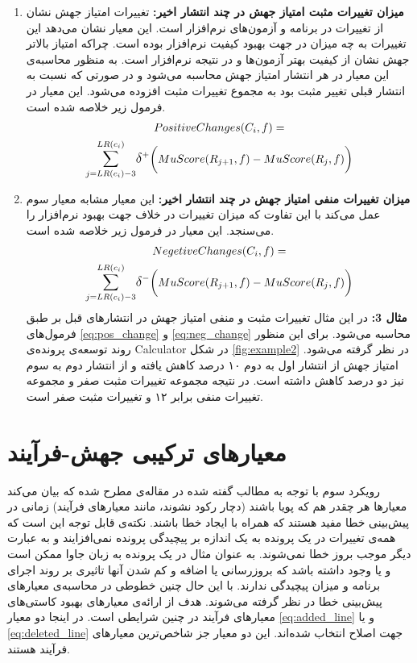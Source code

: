 \begin{enumerate}
	\item 
	\textbf{
		میزان تغییرات مثبت امتیاز جهش  در چند انتشار اخیر:}
	تغییرات امتیاز جهش نشان از تغییرات در برنامه و آزمون‌های نرم‌افزار است. این معیار نشان می‌دهد این تغییرات به چه میزان در جهت بهبود کیفیت نرم‌افزار بوده است. چراکه امتیاز بالاتر جهش نشان از کیفیت بهتر آزمون‌ها و در نتیجه نرم‌افزار است.  به منظور محاسبه‌ی این معیار در هر انتشار امتیاز جهش محاسبه می‌شود و در صورتی که نسبت به انتشار قبلی تغییر مثبت  بود به مجموع تغییرات  مثبت  افزوده می‌شود. این معیار در فرمول زیر خلاصه شده است.
\begin{multline} \label{eq:pos_change}
PositiveChanges(C_i,f) = \\ \mathlarger{\sum}\limits_{j=LR(c_i)-3}^{LR(c_i)} 
\mathlarger{\delta}^+\bigg(MuScore(R_{j+1},f) - MuScore(R_j,f)\bigg) 
\end{multline}	


	\item 
	\textbf{
		میزان تغییرات منفی امتیاز جهش در چند انتشار اخیر:}
	این معیار مشابه معیار سوم عمل می‌کند با این تفاوت که میزان تغییرات در خلاف جهت بهبود نرم‌افزار را می‌سنجد. این معیار در فرمول زیر خلاصه شده است.
\begin{multline} \label{eq:neg_change}
NegetiveChanges(C_i,f) = \\ \mathlarger{\sum}\limits_{j=LR(c_i)-3}^{LR(c_i)} 
\mathlarger{\delta}^-\bigg(MuScore(R_{j+1},f) - MuScore(R_j,f)\bigg) 
\end{multline}	
\textbf{مثال 3:}
در این مثال تغییرات مثبت و منفی امتیاز جهش در انتشارهای قبل   بر طبق فرمول‌های  \ref{eq:pos_change} و \ref{eq:neg_change} محاسبه می‌شود. برای این منظور روند توسعه‌ی پرونده‌ی Calculator در شکل \ref{fig:example2}  در نظر گرفته می‌شود. امتیاز جهش از انتشار اول به دوم ۱۰ درصد کاهش یافته و از انتشار دوم به سوم نیز دو درصد کاهش داشته است. در نتیجه مجموعه تغییرات مثبت صفر و مجموعه تغییرات منفی برابر ۱۲ و تغییرات مثبت صفر است. 
	
\end{enumerate}


\section{معیارهای ترکیبی جهش-فرآیند}

رویکرد سوم با توجه به مطالب گفته شده در مقاله‌ی \cite{rahman2013and} مطرح شده که بیان می‌کند معیارها هر چقدر هم که پویا باشند (دچار رکود نشوند، مانند معیارهای فرآیند) زمانی در پیش‌بینی خطا مفید هستند که همراه با ایجاد خطا باشند. نکته‌ی قابل توجه این است که همه‌ی تغییرات در یک پرونده به یک اندازه  بر پیچیدگی پرونده نمی‌افزایند و به عبارت دیگر موجب بروز خطا نمی‌شوند. به عنوان مثال در یک پرونده به زبان جاوا ممکن است  و یا  وجود داشته باشد که بروزرسانی یا اضافه و کم شدن آنها تاثیری بر روند اجرای برنامه و میزان پیچیدگی ندارند. با این حال  چنین خطوطی در محاسبه‌ی معیارهای پیش‌بینی خطا در نظر گرفته می‌شوند. هدف از ارائه‌ی معیارهای  بهبود کاستی‌های معیارهای فرآیند در چنین شرایطی است. در اینجا دو معیار  \ref{eq:added_line} و یا   \ref{eq:deleted_line} جهت اصلاح انتخاب شده‌اند.  این دو معیار جز شاخص‌ترین معیارهای فرآیند هستند.\\

